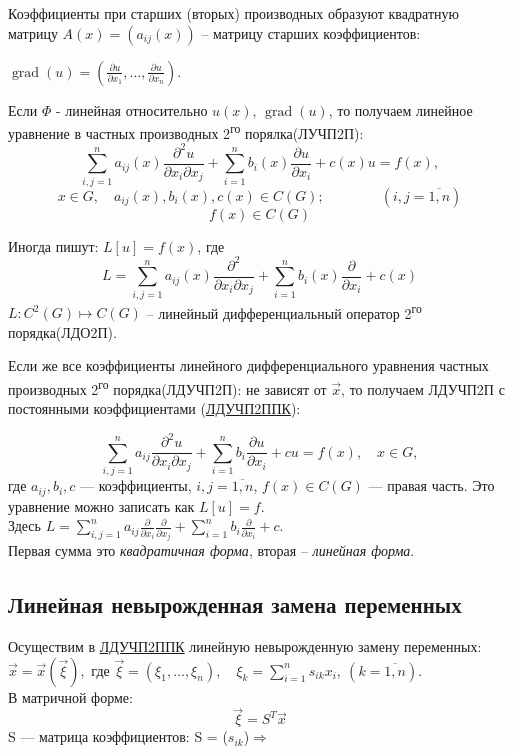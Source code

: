 Коэффициенты при старших (вторых) производных образуют квадратную матрицу $A(x) = (a_{ij}(x))$  – матрицу старших коэффициентов:



\begin{note}
$\operatorname{grad}(u) = (\frac{\partial u}{\partial x_1}, \ldots, \frac{\partial u}{\partial x_n})$.
\end{note}
\begin{note}
Если $\Phi$ - линейная относительно $u(x)$, $\operatorname{grad}(u)$, то получаем линейное уравнение в частных производных 2\textsuperscript{го} порялка(ЛУЧП2П):
$$\sum_{i,j=1}^{n} a_{ij}(x)\frac{\partial^2u}{\partial x_i \partial x_j} + \sum_{i=1}^{n} b_{i}(x)\frac{\partial u}{\partial x_i} + c(x)u = f(x),$$
\[
  x \in G,\quad a_{ij}(x), b_i(x), c(x) \in C(G); \qquad\qquad (i,j = \overline{1,n})
\]
$$f(x) \in C(G)$$
\end{note}
Иногда пишут:
$L[u]=f(x)$, где
$$\displaystyle L= \sum_{i,j=1}^{n} a_{ij}(x)\frac{\partial^2}{\partial x_i \partial x_j} + \sum_{i=1}^{n} b_{i}(x)\frac{\partial }{\partial x_i} + c(x)$$
$\displaystyle L: C^2(G)\mapsto C(G)$ -- линейный дифференциальный оператор 2\textsuperscript{го} порядка(ЛДО2П).\par\medskip


\label{abbr:LDUChPSPPK}
\newcommand{\LDUChPSPPK}{\hyperref[abbr:LDUChPSPPK]{ЛДУЧП2ППК}}
Если же все коэффициенты линейного дифференциального уравнения частных производных 2\textsuperscript{го} порядка(ЛДУЧП2П): не зависят от $\vec x$, то получаем ЛДУЧП2П с постоянными коэффициентами (\LDUChPSPPK{}):

\[
\sum_{i,j=1}^{n} a_{ij}\frac{\partial^2u}{\partial x_i \partial x_j} + \sum_{i=1}^{n} b_{i}\frac{\partial u}{\partial x_i} + cu = f(x), \quad x \in G,
\]
где \(a_{ij}, b_i, c\) --- коэффициенты, \(i,j = \overline{1,n}\), \(f(x) \in C(G)\) --- правая часть. Это уравнение можно записать как \(L[u]=f\).\\
Здесь
$\displaystyle L= 
  \sum_{i,j=1}^{n} a_{ij}\frac{\partial}{\partial x_i} \frac{\partial}{\partial x_j}
  +\sum_{i=1}^{n} b_{i}\frac{\partial }{\partial x_i} + c$.\\ Первая сумма это \emph{квадратичная форма}, вторая -- \emph{линейная форма}.
\subsection{Линейная невырожденная замена переменных}
Осуществим в \LDUChPSPPK{} линейную невырожденную замену переменных:\\
$\displaystyle\vec x=\vec x(\vec \xi),$ где $\displaystyle\vec \xi=(\xi_1, \ldots, \xi_n),\quad \xi_k = \sum_{i=1}^{n}s_{ik}x_i,\ (k=\overline{1,n})$.\\
В матричной форме: $$\vec \xi = S^T \vec x$$
S --- матрица коэффициентов: S = ($s_{ik}$)$\Rightarrow$

